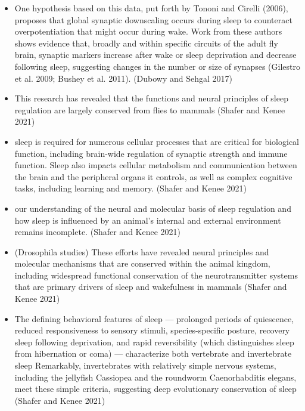 \documentclass[11pt]{article}
\begin{document}
\begin{itemize}
    \item One hypothesis based on this data, put forth by Tononi and Cirelli (2006), proposes 
    that global synaptic downscaling occurs during sleep to counteract overpotentiation that 
    might occur during wake.
    Work from these authors shows evidence that, broadly and within specific circuits of the 
    adult fly brain, synaptic markers increase after wake or sleep deprivation and decrease 
    following sleep, suggesting changes in the number or size of synapses 
    (Gilestro et al. 2009; Bushey et al. 2011).
    \cite{dubowyCircadianRhythmsSleep2017} (Dubowy and Sehgal 2017)

    \item This research has revealed that the functions and neural principles of sleep regulation are largely conserved from flies to mammals
    \cite{shaferRegulationDrosophilaSleep2021} (Shafer and Kenee 2021)

    \item sleep is required for numerous cellular processes that are critical for biological function, including brain-wide regulation of synaptic strength and immune function.
    Sleep also impacts cellular metabolism and communication between the brain and the peripheral organs it controls, as well as complex cognitive tasks, including learning and memory.
    \cite{shaferRegulationDrosophilaSleep2021} (Shafer and Kenee 2021)

    \item our understanding of the neural and molecular basis of sleep regulation and how sleep is influenced by an animal’s internal and external environment remains incomplete.
    \cite{shaferRegulationDrosophilaSleep2021} (Shafer and Kenee 2021)

    \item (Drosophila studies) These efforts have revealed neural principles and molecular mechanisms that are conserved within the animal kingdom, including widespread functional conservation of the neurotransmitter systems that are primary drivers of sleep and wakefulness in mammals
    \cite{shaferRegulationDrosophilaSleep2021} (Shafer and Kenee 2021)

    \item The defining behavioral features of sleep — prolonged periods of quiescence, reduced responsiveness to sensory stimuli, species-specific posture, recovery sleep following deprivation, and rapid reversibility (which distinguishes sleep from hibernation or coma) — characterize both vertebrate and invertebrate sleep
    Remarkably, invertebrates with relatively simple nervous systems, including the jellyfish Cassiopea and the roundworm Caenorhabditis elegans, meet these simple criteria, suggesting deep evolutionary conservation of sleep
    \cite{shaferRegulationDrosophilaSleep2021} (Shafer and Kenee 2021)


\end{itemize}
\end{document}
